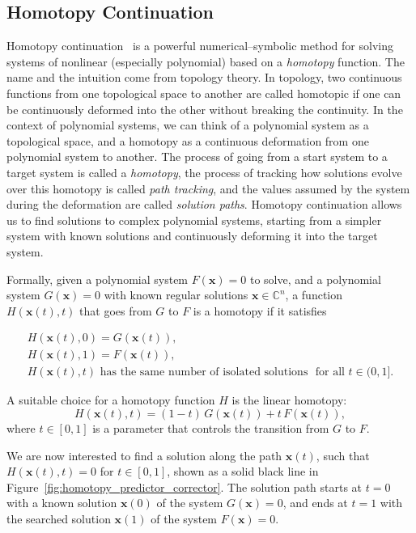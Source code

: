 \subsection{Homotopy Continuation}
\label{sec:homotopy}

Homotopy continuation~\cite{HomotophyContinuationMethods} is a powerful numerical–symbolic method for solving systems of nonlinear (especially polynomial) based on a \emph{homotopy} function. The name and the intuition come from topology theory.
In topology, two continuous functions from one topological space to another are called homotopic if one can be continuously deformed into the other without breaking the continuity. In the context of polynomial systems, we can think of a polynomial system as a topological space, and a homotopy as a continuous deformation from one polynomial system to another.
The process of going from a start system to a target system is called a \emph{homotopy}, the process of tracking how solutions evolve over this homotopy is called \emph{path tracking}, and the values assumed by the system during the deformation are called \emph{solution paths}. Homotopy continuation allows us to find solutions to complex polynomial systems, starting from a simpler system with known solutions and continuously deforming it into the target system.

Formally, given a polynomial system \(F(\mathbf{x})=0\) to solve, and a polynomial system \(G(\mathbf{x})=0\) with known regular solutions \(\mathbf{x}\in\mathbb{C}^n\), a function \(H(\mathbf{x}(t),t)\) that goes from \(G\) to \(F\) is a homotopy if it satisfies

\begin{gather}
	H(\mathbf{x}(t),0)=G(\mathbf{x}(t)), \\
	H(\mathbf{x}(t),1)=F(\mathbf{x}(t)), \\
	H(\mathbf{x}(t),t) \text{ has the same number of isolated solutions } \text{ for all } t\in(0,1].
\end{gather}

A suitable choice for a homotopy function $H$ is the linear homotopy:
\begin{equation}
	H(\mathbf{x}(t),t) = (1-t)\,G(\mathbf{x}(t)) + t\,F(\mathbf{x}(t)),
	\label{eq:linear_homotopy}
\end{equation}
where \(t\in[0,1]\) is a parameter that controls the transition from \(G\) to \(F\).

We are now interested to find a solution along the path \(\mathbf{x}(t)\), such that \(H(\mathbf{x}(t),t)=0\) for \(t\in[0,1]\), shown as a solid black line in Figure~\ref{fig:homotopy_predictor_corrector}. The solution path starts at \(t=0\) with a known solution \(\mathbf{x}(0)\) of the system \(G(\mathbf{x})=0\), and ends at \(t=1\) with the searched solution \(\mathbf{x}(1)\) of the system \(F(\mathbf{x})=0\).

